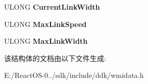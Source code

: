 \begin{DoxyCompactItemize}
\item 
\mbox{\label{struct___m_s_ndis___pci_device_property_ad8d5bfd83a6b7ee1128bc9d4b56d2cf1}} 
U\+L\+O\+NG {\bfseries Current\+Link\+Width}
\item 
\mbox{\label{struct___m_s_ndis___pci_device_property_a1d611b25edbaaa53c767b1fa6cdaeb1a}} 
U\+L\+O\+NG {\bfseries Max\+Link\+Speed}
\item 
\mbox{\label{struct___m_s_ndis___pci_device_property_ae9be7f3b6ca54903cf57159444e3c07d}} 
U\+L\+O\+NG {\bfseries Max\+Link\+Width}
\end{DoxyCompactItemize}


该结构体的文档由以下文件生成\+:\begin{DoxyCompactItemize}
\item 
E\+:/\+React\+O\+S-\/0../sdk/include/ddk/wmidata.\+h\end{DoxyCompactItemize}
